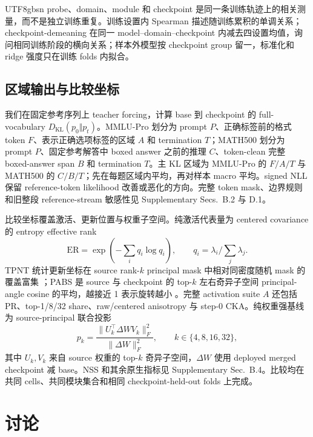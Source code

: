 \documentclass[letterpaper]{article} %
\begin{document}
\begin{CJK*}{UTF8}{gbsn}
probe、domain、module 和 checkpoint 是同一条训练轨迹上的相关测量，而不是独立训练重复。训练设置内 Spearman 描述随训练累积的单调关系；checkpoint-demeaning 在同一 model--domain--checkpoint 内减去四设置均值，询问相同训练阶段的横向关系；样本外模型按 checkpoint group 留一，标准化和 ridge 强度只在训练 folds 内拟合。

\subsection{区域输出与比较坐标}

我们在固定参考序列上 teacher forcing，计算 base 到 checkpoint 的 full-vocabulary
$D_{\mathrm{KL}}(p_0\Vert p_t)$。MMLU-Pro 划分为 prompt $P$、正确标签前的格式 token $F$、表示正确选项标签的区域 $A$ 和 termination $T$；MATH500 划分为 prompt $P$、固定参考解答中 boxed answer 之前的推理 $C$、token-clean 完整 boxed-answer span $B$ 和 termination $T$。主 KL 区域为 MMLU-Pro 的 $F/A/T$ 与 MATH500 的 $C/B/T$；先在每题区域内平均，再对样本 macro 平均。signed NLL 保留 reference-token likelihood 改善或恶化的方向。完整 token mask、边界规则和旧整段 reference-stream 敏感性见 Supplementary Secs.~B.2 与 D.1。

比较坐标覆盖激活、更新位置与权重子空间。纯激活代表量为 centered covariance 的 entropy effective rank \citep{liu2026collapse}
\begin{equation}
\mathrm{ER}=\exp\!\left(-\sum_iq_i\log q_i\right),\qquad
q_i=\lambda_i/\sum_j\lambda_j.
\end{equation}
TPNT 统计更新坐标在 source rank-$k$ principal mask 中相对同密度随机 mask 的覆盖富集 \citep{yu2026dense,zhu2025path}；PABS 是 source 与 checkpoint 的 top-$k$ 左右奇异子空间 principal-angle cosine 的平均，越接近 1 表示旋转越小 \citep{jin2025rlheals}。完整 activation suite $A$ 还包括 PR、top-1/8/32 share、raw/centered anisotropy 与 step-0 CKA。纯权重强基线 \citep{yu2026dense} 为 source-principal 联合投影
\begin{equation}
p_k=\frac{\|U_k^\top\Delta W V_k\|_F^2}{\|\Delta W\|_F^2},
\qquad k\in\{4,8,16,32\},
\label{eq:pk}
\end{equation}
其中 $U_k,V_k$ 来自 source 权重的 top-$k$ 奇异子空间，$\Delta W$ 使用 deployed merged checkpoint 减 base。NSS 和其余原生指标见 Supplementary Sec.~B.4。比较均在共同 cells、共同模块集合和相同 checkpoint-held-out folds 上完成。



\section{讨论}


\end{CJK*}
\end{document}
